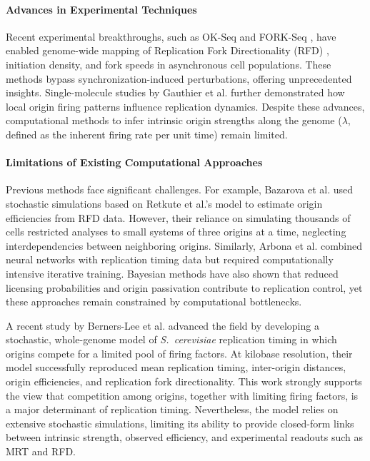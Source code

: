 \documentclass[10pt,a4paper]{revtex4-2}
\begin{document}
\paragraph*{Advances in Experimental Techniques}
Recent experimental breakthroughs, such as OK-Seq \cite{Petryk2016} and FORK-Seq \cite{Hennion2020}, 
have enabled genome-wide mapping of Replication Fork Directionality (RFD) \cite{Wang2021}, 
initiation density, and fork speeds \cite{Theulot2022} in asynchronous cell populations. 
These methods bypass synchronization-induced perturbations, offering unprecedented insights. 
Single-molecule studies by Gauthier et al. \cite{Gauthier2012} further demonstrated how local origin firing patterns influence replication dynamics. 
Despite these advances, computational methods to infer intrinsic origin strengths along the genome (\(\lambda\),
defined as the inherent firing rate per unit time) remain limited.

\paragraph*{Limitations of Existing Computational Approaches}
Previous methods face significant challenges. 
For example, Bazarova et al. \cite{Bazarova2019} used stochastic simulations based on Retkute et al.’s model \cite{Retkute2012} to estimate origin efficiencies 
from RFD data. However, their reliance on simulating thousands of cells restricted analyses to small systems
of three origins at a time, neglecting interdependencies between neighboring origins. 
Similarly, Arbona et al. \cite{Arbona2023} combined neural networks with replication timing data but 
required computationally intensive iterative training. Bayesian methods \cite{Bazarova2019} have also 
shown that reduced licensing probabilities and origin passivation contribute to replication control, 
yet these approaches remain constrained by computational bottlenecks.

A recent study by Berners-Lee et al. \cite{BernersLee2025} 
advanced the field by developing a stochastic, whole-genome model of 
\textit{S.~cerevisiae} replication timing in which origins compete for a limited pool of firing factors. 
At kilobase resolution, their model successfully reproduced mean replication timing, inter-origin distances, 
origin efficiencies, and replication fork directionality. 
This work strongly supports the view that competition among origins, together with limiting firing factors, 
is a major determinant of replication timing. 
Nevertheless, the model relies on extensive stochastic simulations, 
limiting its ability to provide closed-form links between intrinsic strength, observed efficiency, 
and experimental readouts such as MRT and RFD.
\end{document}
